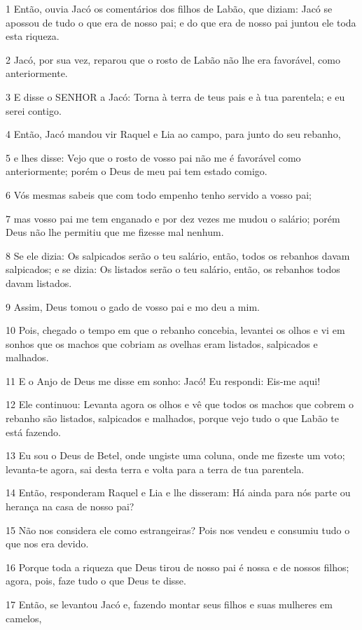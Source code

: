 \par 1 Então, ouvia Jacó os comentários dos filhos de Labão, que diziam: Jacó se apossou de tudo o que era de nosso pai; e do que era de nosso pai juntou ele toda esta riqueza.
\par 2 Jacó, por sua vez, reparou que o rosto de Labão não lhe era favorável, como anteriormente.
\par 3 E disse o SENHOR a Jacó: Torna à terra de teus pais e à tua parentela; e eu serei contigo.
\par 4 Então, Jacó mandou vir Raquel e Lia ao campo, para junto do seu rebanho,
\par 5 e lhes disse: Vejo que o rosto de vosso pai não me é favorável como anteriormente; porém o Deus de meu pai tem estado comigo.
\par 6 Vós mesmas sabeis que com todo empenho tenho servido a vosso pai;
\par 7 mas vosso pai me tem enganado e por dez vezes me mudou o salário; porém Deus não lhe permitiu que me fizesse mal nenhum.
\par 8 Se ele dizia: Os salpicados serão o teu salário, então, todos os rebanhos davam salpicados; e se dizia: Os listados serão o teu salário, então, os rebanhos todos davam listados.
\par 9 Assim, Deus tomou o gado de vosso pai e mo deu a mim.
\par 10 Pois, chegado o tempo em que o rebanho concebia, levantei os olhos e vi em sonhos que os machos que cobriam as ovelhas eram listados, salpicados e malhados.
\par 11 E o Anjo de Deus me disse em sonho: Jacó! Eu respondi: Eis-me aqui!
\par 12 Ele continuou: Levanta agora os olhos e vê que todos os machos que cobrem o rebanho são listados, salpicados e malhados, porque vejo tudo o que Labão te está fazendo.
\par 13 Eu sou o Deus de Betel, onde ungiste uma coluna, onde me fizeste um voto; levanta-te agora, sai desta terra e volta para a terra de tua parentela.
\par 14 Então, responderam Raquel e Lia e lhe disseram: Há ainda para nós parte ou herança na casa de nosso pai?
\par 15 Não nos considera ele como estrangeiras? Pois nos vendeu e consumiu tudo o que nos era devido.
\par 16 Porque toda a riqueza que Deus tirou de nosso pai é nossa e de nossos filhos; agora, pois, faze tudo o que Deus te disse.
\par 17 Então, se levantou Jacó e, fazendo montar seus filhos e suas mulheres em camelos,
